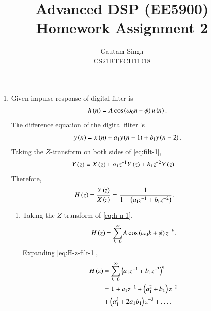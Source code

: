 \documentclass[journal,12pt,twocolumn]{IEEEtran}
\begin{document}
\vspace{3cm}
\title{Advanced DSP (EE5900)\\Homework Assignment 2}
\author{Gautam Singh\\CS21BTECH11018}
\maketitle
\bigskip

\begin{enumerate}[label=\theenumi.]
    \item Given impulse response of digital filter is
        \begin{equation}
            h\left(n\right) = A\cos\left(\omega_0n+\phi\right)u\left(n\right).
            \label{eq:h-n-1}
        \end{equation}
        The difference equation of the digital filter is
        \begin{equation}
            y\left(n\right) = x\left(n\right) + a_1y\left(n-1\right) + b_1y\left(n-2\right).
            \label{eq:filt-1}
        \end{equation}
        Taking the \(Z\)-transform on both sides of \eqref{eq:filt-1},
        \begin{align}
            Y\left(z\right) &= X\left(z\right) + a_1z^{-1}Y\left(z\right) + b_1z^{-2}Y\left(z\right).
        \end{align}
        Therefore,
        \begin{align}
            H\left(z\right) &= \frac{Y\left(z\right)}{X\left(z\right)} = \frac{1}{1 - \left(a_1z^{-1} + b_1z^{-2}\right)}.
            \label{eq:H-z-filt-1}
        \end{align}
        \begin{enumerate}
            \item Taking the \(Z\)-transform of \eqref{eq:h-n-1},
                \begin{equation}
                    H\left(z\right) = \sum_{k=0}^{\infty}A\cos\left(\omega_0k+\phi\right)z^{-k}.
                    \label{eq:H-z-1}
                \end{equation}
                Expanding \eqref{eq:H-z-filt-1},
                \begin{align}
                    H\left(z\right) &= \sum_{k=0}^{\infty}\left(a_1z^{-1}+b_1z^{-2}\right)^k \\
                    &= 1 + a_1z^{-1} + \left(a_1^2+b_1\right)z^{-2} \nonumber \\
                    &+\left(a_1^3+2a_1b_1\right)z^{-3} + \ldots.
                    \label{eq:H-z-direct}
                \end{align}

\end{enumerate}
\end{enumerate}
\end{document}
